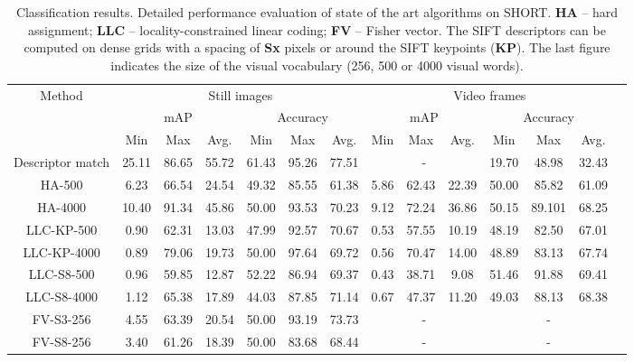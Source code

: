 \begin{table}
\centering
\begin{adjustbox}{max width=1.2\textwidth,center}
\begin{tabular}{cccccccccccccc}
   \toprule
\multirow{3}{*}{Method} & \multicolumn{6}{c}{Still images} & \multicolumn{6}{c}{Video frames}\\
\cline{2-13} 
 &  \multicolumn{3}{c}{mAP} & \multicolumn{3}{c}{Accuracy} & \multicolumn{3}{c}{mAP} & \multicolumn{3}{c}{ Accuracy}\\
& Min & Max & Avg. & Min & Max & Avg. & Min & Max & Avg. & Min & Max & Avg.\\
\hline \hline 
Descriptor match & 25.11 & 86.65 & 55.72 & 61.43 & 95.26 & 77.51 & \multicolumn{3}{c}{-} & 19.70 & 48.98 & 32.43\\
\hline
HA-500 & 6.23 & 66.54 & 24.54 & 49.32 & 85.55 & 61.38 & 5.86 & 62.43 & 22.39 &50.00 & 85.82 & 61.09\\
\hline
HA-4000 & 10.40 & 91.34 & 45.86 & 50.00 & 93.53 & 70.23 & 9.12 & 72.24 & 36.86 & 50.15 & 89.101 & 68.25 \\
\hline
LLC-KP-500 & 0.90 & 62.31 & 13.03 & 47.99 & 92.57 & 70.67  & 0.53 & 57.55 & 10.19 & 48.19 & 82.50 & 67.01\\
\hline
LLC-KP-4000 & 0.89 & 79.06 & 19.73 & 50.00 & 97.64 & 69.72 & 0.56 & 70.47 & 14.00 & 48.89 & 83.13 & 67.74 \\
\hline
LLC-S8-500 & 0.96 & 59.85 & 12.87 & 52.22 & 86.94 & 69.37 & 0.43 & 38.71 & 9.08 & 51.46 & 91.88 & 69.41\\
\hline
LLC-S8-4000 & 1.12 & 65.38 & 17.89 & 44.03 & 87.85 & 71.14 & 0.67 & 47.37 & 11.20 & 49.03 & 88.13 & 68.38\\
\hline
FV-S3-256 & 4.55 & 63.39 & 20.54 & 50.00 & 93.19 & 73.73 & \multicolumn{3}{c}{-} & \multicolumn{3}{c}{-}\\
\hline
FV-S8-256 & 3.40 & 61.26 &  18.39 & 50.00 & 83.68 & 68.44  & \multicolumn{3}{c}{-} & \multicolumn{3}{c}{-}\\
	\bottomrule
\end{tabular}
\end{adjustbox}
\caption{Classification results. Detailed performance evaluation of state of the art algorithms on SHORT. \textbf{HA} -- hard assignment; \textbf{LLC} -- locality-constrained linear coding; \textbf{FV} -- Fisher vector. The SIFT descriptors can be computed on dense grids with a spacing of \textbf{Sx} pixels or around the SIFT keypoints (\textbf{KP}). The last figure indicates the size of the visual vocabulary (256, 500 or 4000 visual words).}
\label{table:classification_results}
\end{table}

